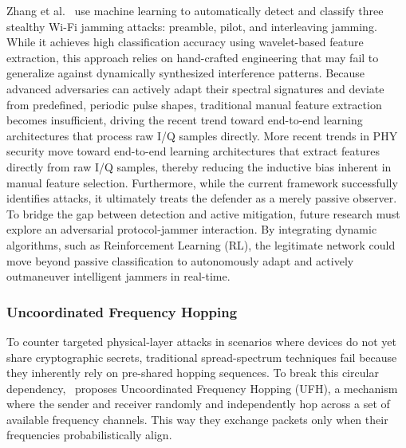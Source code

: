 \documentclass[journal]{IEEEtran}
\newcommand{\adm}[1]{{\color{orange}{[#1]}}}
\newcommand{\rar}[1]{{\color{blue}{[#1]}}}
\begin{document}
Zhang et al.~\cite{zhang2023detection} use machine learning to automatically detect and classify three stealthy Wi-Fi jamming attacks: preamble, pilot, and interleaving jamming.
While it achieves high classification accuracy using wavelet-based feature extraction, this approach relies on hand-crafted engineering that may fail to generalize against %
dynamically synthesized interference patterns. 
Because advanced adversaries can actively adapt their spectral signatures and deviate from predefined, periodic pulse shapes, traditional manual feature extraction becomes insufficient, driving the recent trend toward end-to-end learning architectures that process raw I/Q samples directly.
More recent trends in PHY security move toward end-to-end learning architectures that extract features directly from raw I/Q samples, thereby reducing the inductive bias inherent in manual feature selection. 
Furthermore, while the current framework successfully identifies attacks, it ultimately treats the defender as a merely passive observer.
To bridge the gap between detection and active mitigation, future research must explore an adversarial protocol-jammer interaction.
By integrating dynamic algorithms, such as Reinforcement Learning (RL), the legitimate network could move beyond passive classification to autonomously adapt and actively outmaneuver intelligent jammers in real-time.
\rar{more of jamming detection, we want to focus on jamming attacks}

\subsubsection{Uncoordinated Frequency Hopping}
To counter targeted physical-layer attacks in scenarios where devices do not yet share cryptographic secrets, traditional spread-spectrum techniques fail because they inherently rely on pre-shared hopping sequences.
To break this circular dependency,~\cite{strasser2009novel} proposes Uncoordinated Frequency Hopping (UFH), a mechanism where the sender and receiver randomly and independently hop across a set of available frequency channels.
This way they exchange packets only when their frequencies probabilistically align.
\end{document}

